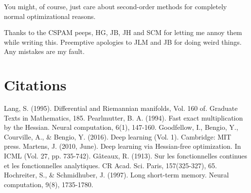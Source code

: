\documentclass{article}
\begin{document}
You might, of course, just care about second-order methods for completely normal optimizational reasons.

Thanks to the CSPAM peeps, HG, JB, JH and SCM for letting me annoy them while writing this. Preemptive apologies to JLM and JB for doing weird things. Any mistakes are my fault.

\section{Citations}

\begin{thebibliography}{9}
Lang, S. (1995). Differential and Riemannian manifolds, Vol. 160 of. Graduate Texts in Mathematics, 185.
Pearlmutter, B. A. (1994). Fast exact multiplication by the Hessian. Neural computation, 6(1), 147-160.
Goodfellow, I., Bengio, Y., Courville, A., \& Bengio, Y. (2016). Deep learning (Vol. 1). Cambridge: MIT press.
Martens, J. (2010, June). Deep learning via Hessian-free optimization. In ICML (Vol. 27, pp. 735-742).
G\^{a}teaux, R. (1913). Sur les fonctionnelles continues et les fonctionnelles analytiques. CR Acad. Sci. Paris, 157(325-327), 65.
Hochreiter, S., \& Schmidhuber, J. (1997). Long short-term memory. Neural computation, 9(8), 1735-1780.
\end{thebibliography}
\end{document}

